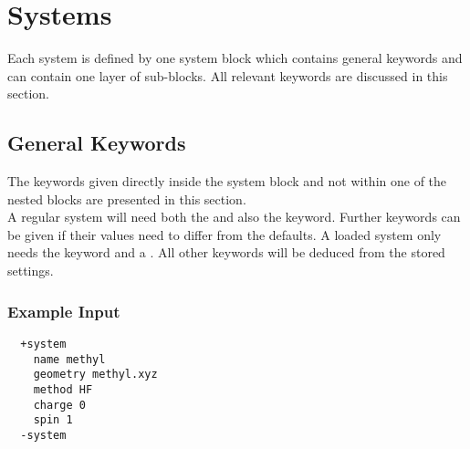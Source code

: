 \section{Systems}\label{sec:system}
Each system is defined by one system block which contains general keywords and can contain one layer of sub-blocks.
All relevant keywords are discussed in this section.
\subsection{General Keywords}\label{sec:system:general}
The keywords given directly inside the system block and not within one of the nested blocks are presented
in this section.\\
A regular system will need both the  and also the  keyword.
Further keywords can be given if their values need to differ from the defaults.
A loaded system only needs the  keyword and a .
All other keywords will be deduced from the stored settings.
\subsubsection{Example Input}
\begin{lstlisting}
  +system
    name methyl
    geometry methyl.xyz
    method HF
    charge 0
    spin 1
  -system
 \end{lstlisting}
